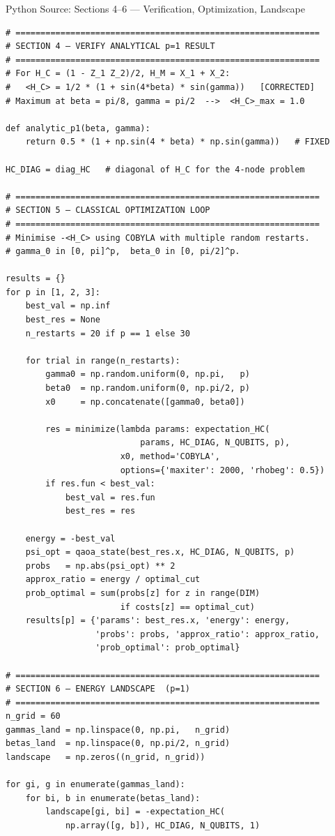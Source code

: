 \documentclass{beamer}
\begin{document}
\begin{frame}{Python Source: Sections 4--6 — Verification, Optimization, Landscape}
\footnotesize
\begin{verbatim}
# =============================================================
# SECTION 4 — VERIFY ANALYTICAL p=1 RESULT
# =============================================================
# For H_C = (1 - Z_1 Z_2)/2, H_M = X_1 + X_2:
#   <H_C> = 1/2 * (1 + sin(4*beta) * sin(gamma))   [CORRECTED]
# Maximum at beta = pi/8, gamma = pi/2  -->  <H_C>_max = 1.0

def analytic_p1(beta, gamma):
    return 0.5 * (1 + np.sin(4 * beta) * np.sin(gamma))   # FIXED

HC_DIAG = diag_HC   # diagonal of H_C for the 4-node problem

# =============================================================
# SECTION 5 — CLASSICAL OPTIMIZATION LOOP
# =============================================================
# Minimise -<H_C> using COBYLA with multiple random restarts.
# gamma_0 in [0, pi]^p,  beta_0 in [0, pi/2]^p.

results = {}
for p in [1, 2, 3]:
    best_val = np.inf
    best_res = None
    n_restarts = 20 if p == 1 else 30

    for trial in range(n_restarts):
        gamma0 = np.random.uniform(0, np.pi,   p)
        beta0  = np.random.uniform(0, np.pi/2, p)
        x0     = np.concatenate([gamma0, beta0])

        res = minimize(lambda params: expectation_HC(
                           params, HC_DIAG, N_QUBITS, p),
                       x0, method='COBYLA',
                       options={'maxiter': 2000, 'rhobeg': 0.5})
        if res.fun < best_val:
            best_val = res.fun
            best_res = res

    energy = -best_val
    psi_opt = qaoa_state(best_res.x, HC_DIAG, N_QUBITS, p)
    probs   = np.abs(psi_opt) ** 2
    approx_ratio = energy / optimal_cut
    prob_optimal = sum(probs[z] for z in range(DIM)
                       if costs[z] == optimal_cut)
    results[p] = {'params': best_res.x, 'energy': energy,
                  'probs': probs, 'approx_ratio': approx_ratio,
                  'prob_optimal': prob_optimal}

# =============================================================
# SECTION 6 — ENERGY LANDSCAPE  (p=1)
# =============================================================
n_grid = 60
gammas_land = np.linspace(0, np.pi,   n_grid)
betas_land  = np.linspace(0, np.pi/2, n_grid)
landscape   = np.zeros((n_grid, n_grid))

for gi, g in enumerate(gammas_land):
    for bi, b in enumerate(betas_land):
        landscape[gi, bi] = -expectation_HC(
            np.array([g, b]), HC_DIAG, N_QUBITS, 1)
\end{verbatim}
\end{frame}
\end{document}

